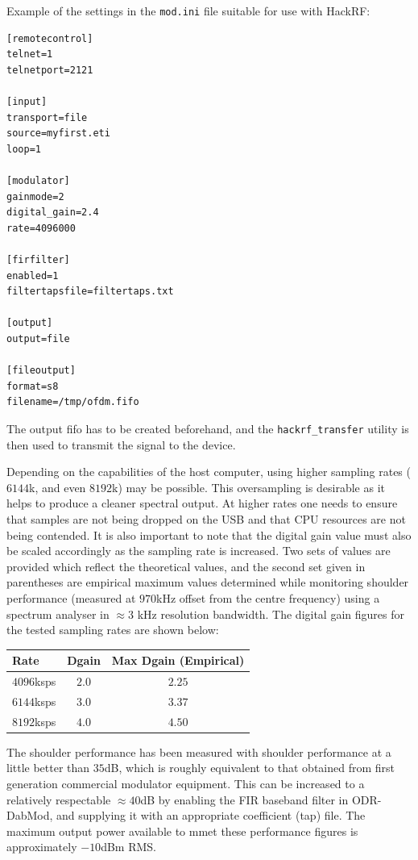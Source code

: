 Example of the settings in the \texttt{mod.ini} file suitable for use with HackRF:

\begin{lstlisting}
[remotecontrol]
telnet=1
telnetport=2121

[input]
transport=file
source=myfirst.eti
loop=1

[modulator]
gainmode=2
digital_gain=2.4
rate=4096000

[firfilter]
enabled=1
filtertapsfile=filtertaps.txt

[output]
output=file

[fileoutput]
format=s8
filename=/tmp/ofdm.fifo

\end{lstlisting}

The output fifo has to be created beforehand, and the \texttt{hackrf\_transfer}
utility is then used to transmit the signal to the device.

Depending on the capabilities of the host computer, using higher sampling rates
($6144$k, and even $8192$k) may be possible. This oversampling is desirable as
it helps to produce a cleaner spectral output. At higher rates one needs to
ensure that samples are not being dropped on the USB and that CPU resources are
not being contended. It is also important to note that the digital gain value
must also be scaled accordingly as the sampling rate is increased. Two sets of
values are provided which reflect the theoretical values, and the second set
given in parentheses are empirical maximum values determined while monitoring
shoulder performance (measured at $970$kHz offset from the centre frequency)
using a spectrum analyser in $\approx 3$ kHz resolution bandwidth. The digital
gain figures for the tested sampling rates are shown below:

\begin{center}
\begin{tabular}{| l | c | c |}
    \hline
    Rate       & Dgain & Max Dgain (Empirical) \\ \hline \hline
    $4096$ksps & $2.0$ & $2.25$ \\ \hline
    $6144$ksps & $3.0$ & $3.37$ \\ \hline
    $8192$ksps & $4.0$ & $4.50$ \\
    \hline
\end{tabular}
\end{center}

The shoulder performance has been measured with shoulder performance at a little
better than $35$dB, which is roughly equivalent to that obtained from first
generation commercial modulator equipment. This can be increased to a relatively
respectable $\approx 40$dB by enabling the FIR baseband filter in ODR-DabMod,
and supplying it with an appropriate coefficient (tap) file. The maximum output
power available to mmet these performance figures is approximately $-10$dBm RMS.

